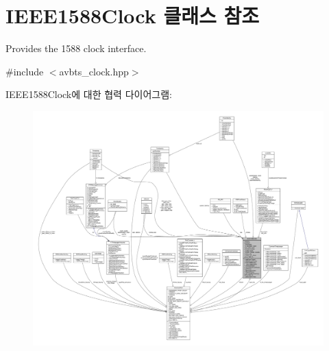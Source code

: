\hypertarget{class_i_e_e_e1588_clock}{}\section{I\+E\+E\+E1588\+Clock 클래스 참조}
\label{class_i_e_e_e1588_clock}


Provides the 1588 clock interface.  




{\ttfamily \#include $<$avbts\+\_\+clock.\+hpp$>$}



I\+E\+E\+E1588\+Clock에 대한 협력 다이어그램\+:
\nopagebreak
\begin{figure}[H]
\begin{center}
\leavevmode
\includegraphics[width=350pt]{class_i_e_e_e1588_clock__coll__graph}
\end{center}
\end{figure}

